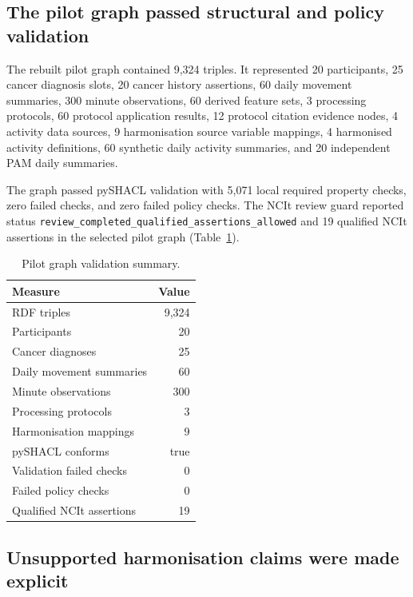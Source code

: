 \documentclass[final,5p,times,twocolumn]{elsarticle}
\begin{document}
\subsection{The pilot graph passed structural and policy validation}

The rebuilt pilot graph contained 9,324 triples. It represented 20 participants, 25 cancer diagnosis slots, 20 cancer history assertions, 60 daily movement summaries, 300 minute observations, 60 derived feature sets, 3 processing protocols, 60 protocol application results, 12 protocol citation evidence nodes, 4 activity data sources, 9 harmonisation source variable mappings, 4 harmonised activity definitions, 60 synthetic daily activity summaries, and 20 independent PAM daily summaries.

The graph passed pySHACL validation with 5,071 local required property checks, zero failed checks, and zero failed policy checks. The NCIt review guard reported status \texttt{review\_completed\_qualified\_assertions\_allowed} and 19 qualified NCIt assertions in the selected pilot graph (Table~\ref{tab:kgvalidation}).

\begin{table}[t]
\caption{Pilot graph validation summary.}
\label{tab:kgvalidation}
\centering
\small
\begin{tabular}{lr}
\toprule
Measure & Value \\
\midrule
RDF triples & 9,324 \\
Participants & 20 \\
Cancer diagnoses & 25 \\
Daily movement summaries & 60 \\
Minute observations & 300 \\
Processing protocols & 3 \\
Harmonisation mappings & 9 \\
pySHACL conforms & true \\
Validation failed checks & 0 \\
Failed policy checks & 0 \\
Qualified NCIt assertions & 19 \\
\bottomrule
\end{tabular}
\end{table}

\subsection{Unsupported harmonisation claims were made explicit}
\end{document}

